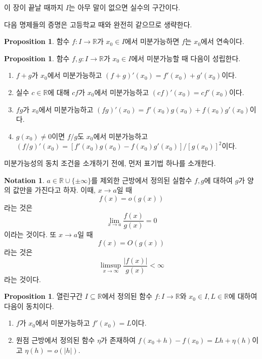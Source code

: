 \documentclass[11pt]{book}
\numberwithin{equation}{chapter}
\def\RR{\mathbb{R}}
\newcommand{\abs}[1]{\left\vert#1\right\vert}
\theoremstyle{definition}
\newtheorem{prop}[thm]{Proposition}
\newtheorem{notn}[thm]{Notation}
\newenvironment{enum}
	{\begin{enumerate}[label=(\alph*), leftmargin=2\parindent]}
	{\end{enumerate}}
\begin{document}
이 장이 끝날 때까지 \(I\)는 아무 말이 없으면 실수의 구간이다.

다음 명제들의 증명은 고등학교 때와 완전히 같으므로 생략한다.

\begin{prop}
    함수 \(f : I \to \RR\)가 \(x_0 \in I\)에서 미분가능하면 \(f\)는 \(x_0\)에서 연속이다.
\end{prop}

\begin{prop}
    함수 \(f, g : I \to \RR\)가 \(x_0 \in I\)에서 미분가능할 때 다음이 성립한다.
    \begin{enum}
        \item \(f+g\)가 \(x_0\)에서 미분가능하고 \((f+g)'(x_0) = f'(x_0) + g'(x_0)\)이다.
        \item 실수 \(c \in \RR\)에 대해 \(cf\)가 \(x_0\)에서 미분가능하고 \((cf)'(x_0) = cf'(x_0)\)이다.
        \item \(fg\)가 \(x_0\)에서 미분가능하고 \((fg)'(x_0) = f'(x_0)g(x_0) + f(x_0)g'(x_0)\)이다.
        \item \(g(x_0) \ne 0\)이면 \(f/g\)도 \(x_0\)에서 미분가능하고 \((f/g)'(x_0) = [f'(x_0)g(x_0) - f(x_0)g'(x_0)] / [g(x_0)]^2\)이다.
    \end{enum}
\end{prop}

미분가능성의 동치 조건을 소개하기 전에, 먼저 표기법 하나를 소개한다.

\begin{notn}
    \(a \in \RR \cup \{\pm \infty\}\)를 제외한 근방에서 정의된 실함수 \(f, g\)에 대하여 \(g\)가 양의 값만을 가진다고 하자. 이때, \(x \to a\)일 때
    \[
    f(x) = o(g(x))
    \]
    라는 것은
    \[
    \lim_{x \to a} \frac{f(x)}{g(x)} = 0    
    \]
    이라는 것이다. 또 \(x \to a\)일 때
    \[
    f(x) = O(g(x))
    \]
    라는 것은
    \[
    \limsup_{x \to \infty} \frac{\abs{f(x)}}{g(x)} < \infty
    \]
    라는 것이다.
\end{notn}

\begin{prop} \label{prop 8.1.5}
    열린구간 \(I \subseteq \RR\)에서 정의된 함수 \(f : I \to \RR\)와 \(x_0 \in I, L \in \RR\)에 대하여 다음이 동치이다.
    \begin{enum}
        \item \(f\)가 \(x_0\)에서 미분가능하고 \(f'(x_0) = L\)이다.
        \item 원점 근방에서 정의된 함수 \(\eta\)가 존재하여 \(f(x_0 + h) - f(x_0) = L h + \eta(h)\)이고 \(\eta(h) = o(\abs{h})\).
    \end{enum}
\end{prop}
\end{document}

